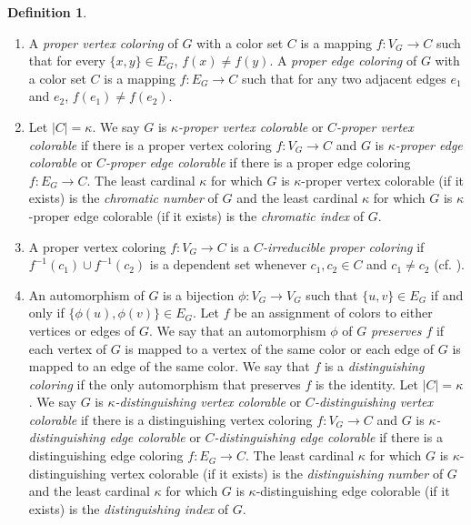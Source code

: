 \documentclass[12pt,reqno,a4paper]{amsart}
\theoremstyle{definition}
\newtheorem{defn}{Definition}[section]
\begin{document}
\begin{defn}
\begin{enumerate}
			\item A {\em proper vertex coloring} of  $G$ with a color set $C$ is a mapping $f:V_{G}\rightarrow C$ such that for every $\{x,y\}\in E_{G}$, $f(x)\not= f(y)$. A {\em proper edge coloring} of $G$ with a color set $C$ is a mapping $f:E_{G}\rightarrow C$ such that for any two adjacent edges $e_{1}$ and $e_{2}$, $f(e_{1})\not= f(e_{2})$.
			
			
			\item Let $\vert C\vert =\kappa$. We say $G$ is {\em $\kappa$-proper vertex colorable} or {\em $C$-proper vertex colorable} if there is a proper vertex coloring $f: V_{G} \rightarrow C$ and $G$ is {\em $\kappa$-proper edge colorable} or {\em $C$-proper edge colorable} if there is a proper edge coloring $f: E_{G} \rightarrow C$. The least cardinal $\kappa$ for which $G$ is $\kappa$-proper vertex colorable (if it exists) is the {\em chromatic number} of $G$ and the least cardinal $\kappa$  for which $G$ is $\kappa$-proper edge colorable (if it exists) is the {\em chromatic index} of $G$. 
			
			\item A proper vertex coloring $f: V_{G} \rightarrow C$ is a {\em $C$-irreducible proper coloring} if $f^{-1}(c_{1})\cup f^{-1}(c_{2})$ is a dependent set whenever $c_{1}, c_{2}\in C$ and $c_{1} \not= c_{2}$ (cf. \cite{GK1991}). 
			
			\item An automorphism of $G$ is a bijection $\phi: V_{G}\rightarrow V_{G}$ such that $\{u,v\}\in E_{G}$ if and only if $\{\phi(u),\phi(v)\}\in E_{G}$. 
			Let $f$ be an assignment of colors to either vertices or edges of $G$. 
			We say that an automorphism $\phi$ of $G$ {\em preserves $f$} if each vertex of $G$ is mapped to a vertex of the same color or each edge of $G$ is mapped to an edge of the same color.
			We say that $f$ is a {\em distinguishing coloring} if the only automorphism that preserves $f$ is the identity. Let $\vert C\vert =\kappa$. We say $G$ is {\em $\kappa$-distinguishing vertex colorable} or {\em $C$-distinguishing vertex colorable} if there is a distinguishing vertex coloring $f: V_{G} \rightarrow C$ and $G$ is {\em $\kappa$-distinguishing edge colorable} or {\em $C$-distinguishing edge colorable} if there is a distinguishing edge coloring $f: E_{G} \rightarrow C$. The least cardinal $\kappa$ for which $G$ is $\kappa$-distinguishing vertex colorable (if it exists) is the {\em distinguishing number} of $G$ and the least cardinal $\kappa$ for which $G$ is $\kappa$-distinguishing edge colorable (if it exists) is the {\em distinguishing index} of $G$. 
			

\end{enumerate}
\end{defn}
\end{document}
